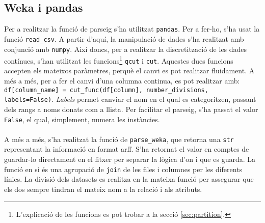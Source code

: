 \subsection{Weka i pandas}
	Per a realitzar la funció de parseig s'ha utilitzat \texttt{pandas}. Per a fer-ho, s'ha usat la funció
	\verb|read_csv|.  A partir d'aquí, la manipulació de dades s'ha realitzat amb conjunció amb 
	\texttt{numpy}. Així doncs, per a realitzar la discretització de les dades contínues, s'han utilitzat les
	funcions\footnote{L'explicació de les funcions es pot trobar a la secció \ref{sec:partition}.} \texttt{qcut} i \texttt{cut}. Aquestes dues funcions
	accepten els mateixos paràmetres, perquè el canvi es pot realitzar fluidament. A més a més,
	per a fer el canvi d'una columna continua, es pot realitzar amb:
	\verb|df[column_name] = cut_func(df[column], number_divisions, labels=False)|. 
	\textit{Labels} permet canviar el nom en el qual es categoritzen, passant dels rangs a noms
	donats com a llista. Per facilitar el parseig, s'ha passat el valor \texttt{False}, el qual, simplement, numera les instàncies. \\
	\\
	A més a més, s'ha realitzat la funció de \verb|parse_weka|, que retorna una \texttt{str} 
	representant la informació en format arff. S'ha retornat el valor en comptes de guardar-lo directament
	en el fitxer per separar la lògica d'on i que es guarda. La funció en si és una agrupació de 
	\texttt{join} de les files i columnes per les diferents línies. La divisió dels datasets es realitza
	en la mateixa funció per assegurar que els dos sempre tindran el mateix nom a la relació i als
	atributs.
